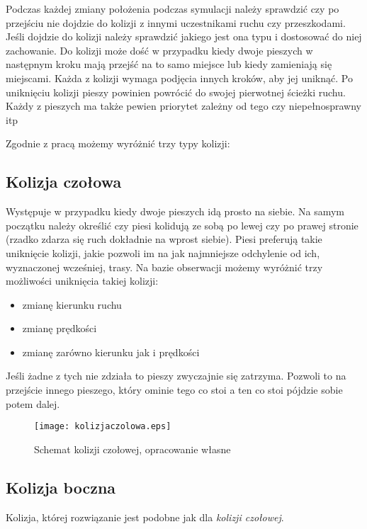Podczas każdej zmiany położenia podczas symulacji należy sprawdzić czy po przejściu nie dojdzie do kolizji z innymi uczestnikami ruchu czy przeszkodami. Jeśli dojdzie do kolizji należy sprawdzić jakiego jest ona typu i dostosować do niej zachowanie. Do kolizji może dość w przypadku kiedy dwoje pieszych w następnym kroku mają przejść na to samo miejsce lub kiedy zamieniają się miejscami. Każda z kolizji wymaga podjęcia innych kroków, aby jej uniknąć. Po uniknięciu kolizji pieszy powinien powrócić do swojej pierwotnej ścieżki ruchu. Każdy z pieszych ma także pewien priorytet zależny od tego czy niepełnosprawny itp

Zgodnie z pracą \cite{Collision} możemy wyróżnić trzy typy kolizji:

\subsection{Kolizja czołowa}

Występuje w przypadku kiedy dwoje pieszych idą prosto na siebie. Na samym początku należy określić czy piesi kolidują ze sobą po lewej czy po prawej stronie (rzadko zdarza się ruch dokładnie na wprost siebie). Piesi preferują takie uniknięcie kolizji, jakie pozwoli im na jak najmniejsze odchylenie od ich, wyznaczonej wcześniej, trasy. Na bazie obserwacji możemy wyróżnić trzy możliwości uniknięcia takiej kolizji:

\begin{itemize}
\item zmianę kierunku ruchu
\item zmianę prędkości
\item zmianę zarówno kierunku jak i prędkości
\end{itemize}

Jeśli żadne z tych nie zdziała to pieszy zwyczajnie się zatrzyma. Pozwoli to na przejście innego pieszego, który ominie tego co stoi a ten co stoi pójdzie sobie potem dalej.


\begin{figure}
\centering
\texttt{[image: kolizjaczolowa.eps]}
\caption{Schemat kolizji czołowej, opracowanie własne}
\end{figure}

\subsection{Kolizja boczna}

Kolizja, której rozwiązanie jest podobne jak dla \textit{kolizji czołowej}.

